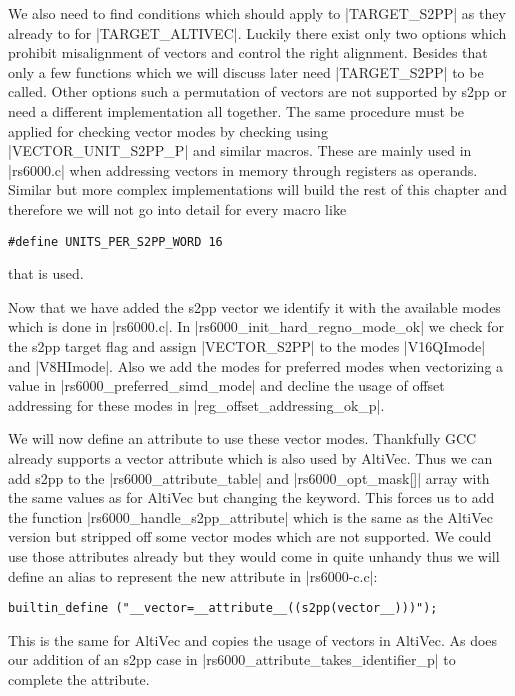 We also need to find conditions which should apply to |TARGET_S2PP| as they already to for |TARGET_ALTIVEC|.
Luckily there exist only two options which prohibit misalignment of vectors and control the right alignment.
Besides that only a few functions which we will discuss later need |TARGET_S2PP| to be called.
Other options such a permutation of vectors are not supported by s2pp or need a different implementation all together.
The same procedure must be applied for checking vector modes by checking using |VECTOR_UNIT_S2PP_P| and similar macros.
These are mainly used in |rs6000.c| when addressing vectors in memory through registers as operands.
Similar but more complex implementations will build the rest of this chapter and therefore we will not go into detail for every macro like
\begin{lstlisting}
#define UNITS_PER_S2PP_WORD 16
\end{lstlisting} 
that is used.

Now that we have added the s2pp vector we identify it with the available modes which is done in |rs6000.c|.
In |rs6000_init_hard_regno_mode_ok| we check for the s2pp target flag and assign |VECTOR_S2PP| to the modes |V16QImode| and |V8HImode|.
Also we add the modes for preferred modes when vectorizing a value in |rs6000_preferred_simd_mode| and decline the usage of offset addressing for these modes in |reg_offset_addressing_ok_p|.

We will now define an attribute to use these vector modes.
Thankfully GCC already supports a vector attribute which is also used by AltiVec.
Thus we can add s2pp to the |rs6000_attribute_table| and |rs6000_opt_mask[]| array with the same values as for AltiVec but changing the keyword.
This forces us to add the function |rs6000_handle_s2pp_attribute| which is the same as the AltiVec version but stripped off some vector modes which are not supported.
We could use those attributes already but they would come in quite unhandy thus we will define an alias to represent the new attribute in |rs6000-c.c|:
\begin{lstlisting}
builtin_define ("__vector=__attribute__((s2pp(vector__)))");
\end{lstlisting}
This is the same for AltiVec and copies the usage of vectors in AltiVec.
As does our addition of an s2pp case in |rs6000_attribute_takes_identifier_p| to complete the attribute.

